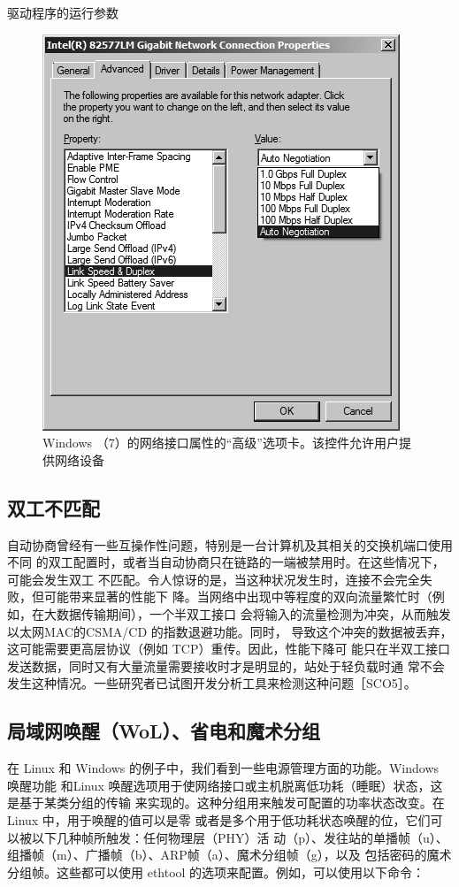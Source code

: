 驱动程序的运行参数

\begin{figure}
    \centering
    \includegraphics[scale=0.5]{imgs/3/3-6.png}
    \caption{Windows （7）的网络接口属性的“高级”选项卡。该控件允许用户提供网络设备}
\end{figure}

\subsection{双工不匹配}

自动协商曾经有一些互操作性问题，特别是一台计算机及其相关的交换机端口使用不同
的双工配置时，或者当自动协商只在链路的一端被禁用时。在这些情况下，可能会发生双工
不匹配。令人惊讶的是，当这种状况发生时，连接不会完全失败，但可能带来显著的性能下
降。当网络中出现中等程度的双向流量繁忙时（例如，在大数据传输期间），一个半双工接口
会将输入的流量检测为冲突，从而触发以太网MAC的CSMA/CD 的指数退避功能。同时，
导致这个冲突的数据被丢弃，这可能需要更高层协议（例如 TCP）重传。因此，性能下降可
能只在半双工接口发送数据，同时又有大量流量需要接收时才是明显的，站处于轻负载时通
常不会发生这种情况。一些研究者已试图开发分析工具来检测这种问题［SCO5］。

\subsection{局域网唤醒（WoL）、省电和魔术分组}

在 Linux 和 Windows 的例子中，我们看到一些电源管理方面的功能。Windows 唤醒功能
和Linux 唤醒选项用于使网络接口或主机脱离低功耗（睡眠）状态，这是基于某类分组的传输
来实现的。这种分组用来触发可配置的功率状态改变。在Linux 中，用于唤醒的值可以是零
或者是多个用于低功耗状态唤醒的位，它们可以被以下几种帧所触发：任何物理层（PHY）活
动（p）、发往站的单播帧（u）、组播帧（m）、广播帧（b）、ARP帧（a）、魔术分组帧（g），以及
包括密码的魔术分组帧。这些都可以使用 ethtool 的选项来配置。例如，可以使用以下命令：

